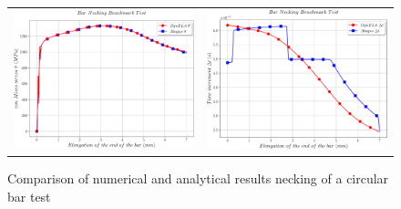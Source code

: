 \begin{figure}[h]
\begin{centering}
\begin{tabular}{cc}
\includegraphics[width=0.45\columnwidth]{Figures/Samples/Plasticity/BarNecking_vonMises} & \includegraphics[width=0.45\columnwidth]{Figures/Samples/Plasticity/BarNecking_timeStep}\tabularnewline
\end{tabular}
\par\end{centering}
\caption{Comparison of numerical and analytical results necking of a circular
bar test\label{fig:Samples!Plasticity!BarAxi-comparison}}
\end{figure}

